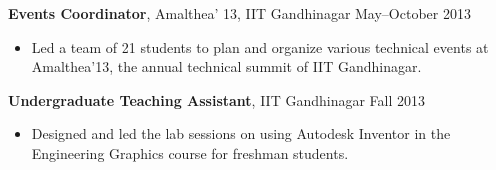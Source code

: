 \documentclass[margin]{res}
\begin{document}
\begin{resume}
{\bf Events Coordinator}, Amalthea' 13, IIT Gandhinagar \hfill May--October 2013
\begin{itemize}
	\item Led a team of 21 students to plan and organize various technical events at Amalthea'13, the annual technical summit of IIT Gandhinagar.
\end{itemize}

{\bf Undergraduate Teaching Assistant}, IIT Gandhinagar \hfill Fall 2013
\begin{itemize}
	\item Designed and led the lab sessions on using Autodesk Inventor in the Engineering Graphics course for freshman students.
\end{itemize}

%
%

\end{resume}
\end{document}
